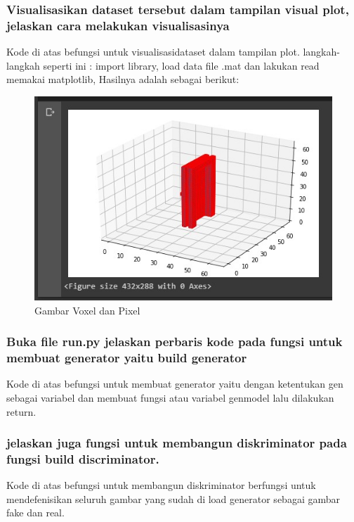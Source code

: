 \subsubsection{Visualisasikan dataset tersebut dalam tampilan visual plot, jelaskan cara melakukan visualisasinya}

Kode di atas befungsi untuk visualisasidataset dalam tampilan plot. langkah-langkah seperti ini :
	import library, load data file .mat dan lakukan read memakai matplotlib, Hasilnya adalah sebagai berikut:
\begin{figure}[H]
	\centering
	\includegraphics[width=12cm]{figures/1174067/8/no8.jpg}
	\caption{Gambar Voxel dan Pixel}
\end{figure}

\subsubsection{Buka file run.py jelaskan perbaris kode pada fungsi untuk membuat generator yaitu build generator}
\hfill\break

Kode di atas befungsi untuk membuat generator yaitu dengan ketentukan gen sebagai variabel dan membuat fungsi atau variabel genmodel lalu dilakukan return. 

\subsubsection{jelaskan juga fungsi untuk membangun diskriminator pada fungsi build discriminator.}
\hfill\break

Kode di atas befungsi untuk membangun diskriminator berfungsi untuk mendefenisikan seluruh gambar yang sudah di load generator sebagai gambar fake dan real.

